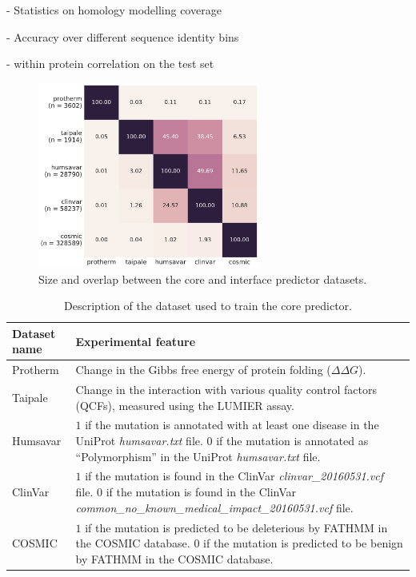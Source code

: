 
- Statistics on homology modelling coverage

- Accuracy over different sequence identity bins

- within protein correlation on the test set


\clearpage



\begin{figure}[h]
	\centering
	\includegraphics[width=0.65\textwidth]{static/elaspic_training_set/core_data_statistics/training_set_overlap_final.pdf}
	\caption{Size and overlap between the core and interface predictor datasets.}
\end{figure}


\begin{table}[h]
\caption{Description of the dataset used to train the core predictor.} \label{tab:core_datasets}
\begin{tabular}{l | p{13cm}}
	\toprule
	Dataset name & Experimental feature \\
	\midrule
	Protherm \cite{kumar_protherm_2006} & Change in the Gibbs free energy of protein folding ($\Delta \Delta G$). \\
	Taipale \cite{sahni_widespread_2015} & Change in the interaction with various quality control factors (QCFs), measured using the LUMIER assay. \\
	Humsavar \cite{consortium_uniprot:_2015} & $1$ if the mutation is annotated with at least one disease in the UniProt \textit{humsavar.txt} file. $0$ if the mutation is annotated as ``Polymorphism'' in the UniProt \textit{humsavar.txt} file. \\
	ClinVar \cite{landrum_clinvar:_2016} & $1$ if the mutation is found in the ClinVar \textit{clinvar\_20160531.vcf} file. $0$ if the mutation is found in the ClinVar \textit{common\_no\_known\_medical\_impact\_20160531.vcf} file. \\
	COSMIC \cite{forbes_cosmic:_2015} & $1$ if the mutation is predicted to be deleterious by FATHMM in the COSMIC database. $0$ if the mutation is predicted to be benign by FATHMM in the COSMIC database. \\
	\bottomrule
\end{tabular}
\end{table}

